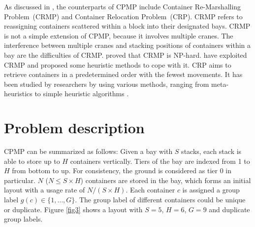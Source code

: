 \documentclass[review,3p,times,authoryear,12pt]{elsarticle}
\begin{document}
As discussed in \cite{Caserta2011}, the counterparts of CPMP include Container Re-Marshalling Problem~(CRMP) and Container Relocation Problem~(CRP). CRMP refers to reassigning containers scattered within a block into their designated bays. CRMP is not a simple extension of CPMP, because it involves multiple cranes. The interference between multiple cranes and stacking positions of containers within a bay are the difficulties of CRMP.
\cite{Caserta2011} proved that CRMP is NP-hard. \cite{Kim1998, Kang2006Plan, Park2009Plan, Choe2011} have exploited CRMP and proposed some heuristic methods to cope with it. CRP aims to retrieve containers in a predetermined order with the fewest movements. It has been studied by researchers by using various methods, ranging from meta-heuristics to simple heuristic algorithms \citep{Kim2006A, Yang2006A, Caserta2009A,Caserta2009Applying,Lee2010A,Caserta2012AM, Forster2012A, Zhu2012Iter}.


%
%

\section{Problem description}
\label{sec:pd}

CPMP can be summarized as follows: Given a bay with $S$ stacks, each stack is able to store up to $H$ containers vertically. Tiers of the bay are indexed from 1 to $H$ from bottom to up. For consistency, the ground is considered as tier 0 in particular.
$N$ ($N\le S\times H$) containers are stored in the bay, which forms an initial layout with a usage rate of $N/(S\times H)$. Each container $c$ is assigned a group label $g(c)\in \{1,\dots,G\}$. The group label of different containers could be unique or duplicate. Figure \ref{fig3} shows a layout with $S=5$, $H=6$, $G=9$ and duplicate group labels.
\end{document}
